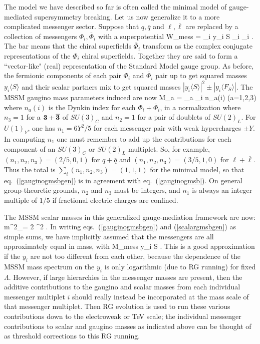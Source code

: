 The model we have described so far is often called the minimal
model of gauge-mediated supersymmetry breaking. Let us now generalize it
to a more complicated messenger sector.
Suppose that $q, \overline q$ and $\ell, \overline \ell $ are replaced
by a collection of messengers $\Phi_i,\overline \Phi_i$ with a
superpotential
\beq
W_{\rm mess} = \sum_i y_i S \Phi_i \overline \Phi_i
. 
\eeq
The
bar means that the chiral
superfields $\overline \Phi_i$ transform as the complex conjugate
representations of the $\Phi_i$ chiral superfields. Together they are said
to form a ``vector-like" (real) representation of the Standard Model gauge
group.
As
before, the fermionic components of each pair $\Phi_i$ and
$\overline\Phi_i$ pair up to get squared masses 
$y_i \langle S \rangle$ and their scalar partners mix to get squared
masses $|y_i \langle S \rangle|^2 \pm |y_i \langle F_S \rangle | $. The
MSSM gaugino mass parameters induced are now
\beq
M_a = {\alpha_a\pi} \Lambda \sum_i n_a(i) \qquad\>\>\>(a=1,2,3)
\label{gauginogmsbgen}
\eeq
where $n_a(i)$ is the Dynkin index for each $\Phi_i+\overline \Phi_i$,
in a normalization where $n_3 = 1$ for a 
${\bf 3} + {\bf \overline 3}$ of $SU(3)_C$ and $n_2 = 1$ for a
pair of doublets of $SU(2)_L$. For $U(1)_Y$, one has $n_1 = 6Y^2/5$
for each messenger pair with weak hypercharges $\pm Y$. 
In computing $n_1$ one must remember to add up the contributions for each
component of an $SU(3)_C$
or $SU(2)_L$ multiplet. So, for example,
$(n_1, n_2, n_3) = (2/5, 0, 1)$ for $q+\overline q$ and 
$(n_1, n_2, n_3) = (3/5, 1, 0)$ for $\ell+\overline \ell$.
Thus the total is 
$\sum_i (n_1, n_2, n_3) = (1, 1, 1)$ for the minimal model, so that
eq.~(\ref{gauginogmsbgen}) is in agreement
with
eq.~(\ref{gauginogmsb}). On general group-theoretic grounds, $n_2$ and
$n_3$ must be integers,
and $n_1$ is always an integer multiple of $1/5$
if fractional electric charges are confined.

The MSSM scalar masses in this generalized gauge-mediation framework are
now:
\beq  
m^2_\phi =
2 \Lambda^2
 .
\label{scalargmsbgen}
\eeq
In writing eqs.~(\ref{gauginogmsbgen}) and (\ref{scalargmsbgen}) as
simple sums,
we have implicitly assumed that the messengers are all approximately equal
in
mass, with
\beq
M_{\rm mess} \approx y_i \langle S \rangle .
\eeq
This is a good approximation if the $y_i$ are not too
different from each other, because the dependence of the MSSM mass
spectrum
on the $y_i$ is only logarithmic (due to RG running) for fixed $\Lambda$.
However, if large hierarchies in the
messenger masses are present, then the additive
contributions
to the gaugino and scalar masses from each individual messenger multiplet
$i$ should really instead be incorporated at the mass scale of that
messenger
multiplet.
Then RG evolution is used to run these various contributions down to
the electroweak or TeV scale; the individual messenger contributions
to scalar and gaugino masses as indicated above can be thought of as
threshold corrections to this RG running.

